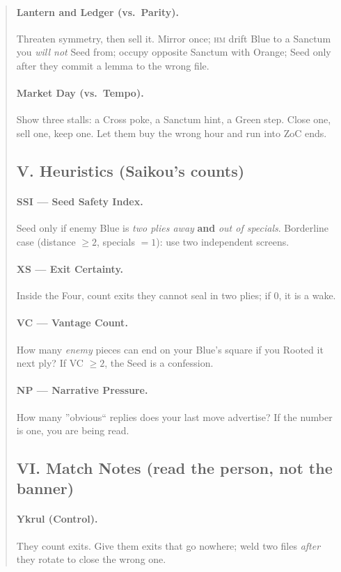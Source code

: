 \documentclass[11pt]{article}
\begin{document}
\begin{quote}
\paragraph{Lantern and Ledger (vs.\ Parity).}
Threaten symmetry, then sell it. Mirror once; \textsc{hm} drift Blue to a Sanctum you \emph{will not} Seed from; occupy opposite Sanctum with Orange; Seed only after they commit a lemma to the wrong file.

\paragraph{Market Day (vs.\ Tempo).}
Show three stalls: a Cross poke, a Sanctum hint, a Green step. Close one, sell one, keep one. Let them buy the wrong hour and run into ZoC ends.

\subsection{V. Heuristics (Saikou's counts)}
\paragraph{SSI --- Seed Safety Index.} Seed only if enemy Blue is \emph{two plies away} \textbf{and} \emph{out of specials}. Borderline case (distance $\ge 2$, specials $=1$): use two independent screens.
\paragraph{XS --- Exit Certainty.} Inside the Four, count exits they cannot seal in two plies; if $0$, it is a wake.
\paragraph{VC --- Vantage Count.} How many \emph{enemy} pieces can end on your Blue's square if you Rooted it next ply? If VC $\ge 2$, the Seed is a confession.
\paragraph{NP --- Narrative Pressure.} How many ''obvious`` replies does your last move advertise? If the number is one, you are being read.

\subsection{VI. Match Notes (read the person, not the banner)}
\paragraph{Ykrul (Control).} They count exits. Give them exits that go nowhere; weld two files \emph{after} they rotate to close the wrong one.

\end{quote}
\end{document}
